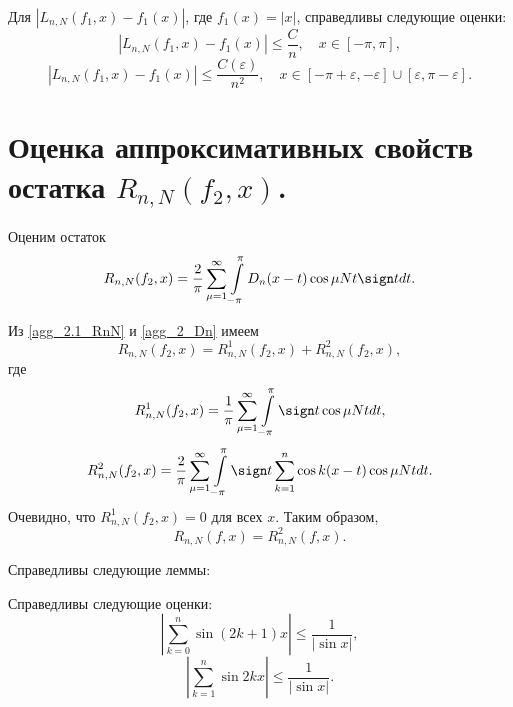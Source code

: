 \begin{theorem} \label{th_abs_2}
  Для $|L_{n,N}(f_1,x) - f_1(x)|$, где $f_1(x) = |x|$, справедливы следующие оценки:
  \begin{equation}
    |L_{n,N}(f_1,x) - f_1(x)| \leq \frac{C}{n}, \quad x \in [-\pi,\pi],
  \end{equation}
  \begin{equation}
    |L_{n,N}(f_1,x) - f_1(x)| \leq \frac{C(\varepsilon)}{n^2}, \quad x \in [-\pi + \varepsilon,- \varepsilon] \cup [\varepsilon, \pi - \varepsilon].
  \end{equation}
\end{theorem}




\section{Оценка аппроксимативных свойств остатка $R_{n,N}(f_2,x)$.}
Оценим остаток
\begin{equation}
  R_{n,N}(f_2,x) = \frac{2}{\pi} \sum\limits_{\mu=1}^{\infty} \int\limits_{-\pi}^{\pi} D_n(x-t) \cos \mu N t \sign t dt. \label{agg_2.1_RnN}
\end{equation}

Из \eqref{agg_2.1_RnN} и \eqref{agg_2_Dn} имеем
\begin{equation}
  R_{n,N}(f_2,x) = R^1_{n,N}(f_2,x) + R^2_{n,N}(f_2,x),
\end{equation}
где
\begin{equation}
  R^1_{n,N}(f_2,x) = \frac{1}{\pi} \sum\limits_{\mu=1}^{\infty} \int\limits_{-\pi}^{\pi} \sign t \cos \mu N t dt,
\end{equation}
\begin{equation} \label{r2 sign}
  R^2_{n,N}(f_2,x) = \frac{2}{\pi} \sum\limits_{\mu=1}^{\infty} \int\limits_{-\pi}^{\pi} \sign t \sum\limits_{k=1}^{n} \cos k (x-t) \cos \mu N t dt.
\end{equation}
Очевидно, что $R^1_{n,N}(f_2,x) = 0$ для всех $x$. Таким образом,
\begin{equation}
  R_{n,N}(f,x) = R^2_{n,N}(f,x). \label{r eq r2}
\end{equation}

Справедливы следующие леммы:
\begin{lemma} \label{lemma sum sin}
  Справедливы следующие оценки:
  \begin{equation}
    \left|\sum_{k=0}^{n} \sin (2k+1)x\right| \leq \frac{1}{|\sin x|}, \label{sum sin 2k+1}
  \end{equation}
  \begin{equation}
    \left|\sum_{k=1}^{n} \sin 2kx\right| \leq \frac{1}{|\sin x|}. \label{sum sin 2k}
  \end{equation}
\end{lemma}

